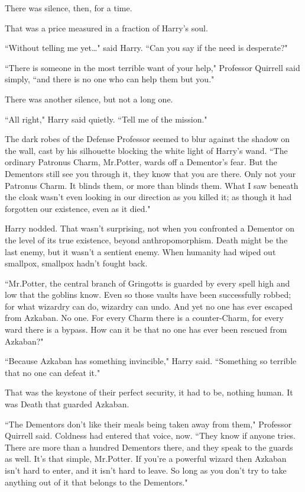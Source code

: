 There was silence, then, for a time.

That was a price measured in a fraction of Harry's soul.

``Without telling me yet{\ldots}" said Harry. ``Can you say if the need is desperate?"

``There is someone in the most terrible want of your help," Professor Quirrell said simply, ``and there is no one who can help them but you."

There was another silence, but not a long one.

``All right," Harry said quietly. ``Tell me of the mission."

The dark robes of the Defense Professor seemed to blur against the shadow on the wall, cast by his silhouette blocking the white light of Harry's wand. ``The ordinary Patronus Charm, Mr.\?Potter, wards off a Dementor's fear. But the Dementors still see you through it, they know that you are there. Only not your Patronus Charm. It blinds them, or more than blinds them. What I saw beneath the cloak wasn't even looking in our direction as you killed it; as though it had forgotten our existence, even as it died."

Harry nodded. That wasn't surprising, not when you confronted a Dementor on the level of its true existence, beyond anthropomorphism. Death might be the last enemy, but it wasn't a sentient enemy. When humanity had wiped out smallpox, smallpox hadn't fought back.

``Mr.\?Potter, the central branch of Gringotts is guarded by every spell high and low that the goblins know. Even so those vaults have been successfully robbed; for what wizardry can do, wizardry can undo. And yet no one has ever escaped from Azkaban. No one. For every Charm there is a counter-Charm, for every ward there is a bypass. How can it be that no one has ever been rescued from Azkaban?"

``Because Azkaban has something invincible," Harry said. ``Something so terrible that no one can defeat it."

That was the keystone of their perfect security, it had to be, nothing human. It was Death that guarded Azkaban.

``The Dementors don't like their meals being taken away from them," Professor Quirrell said. Coldness had entered that voice, now. ``They know if anyone tries. There are more than a hundred Dementors there, and they speak to the guards as well. It's that simple, Mr.\?Potter. If you're a powerful wizard then Azkaban isn't hard to enter, and it isn't hard to leave. So long as you don't try to take anything out of it that belongs to the Dementors."

